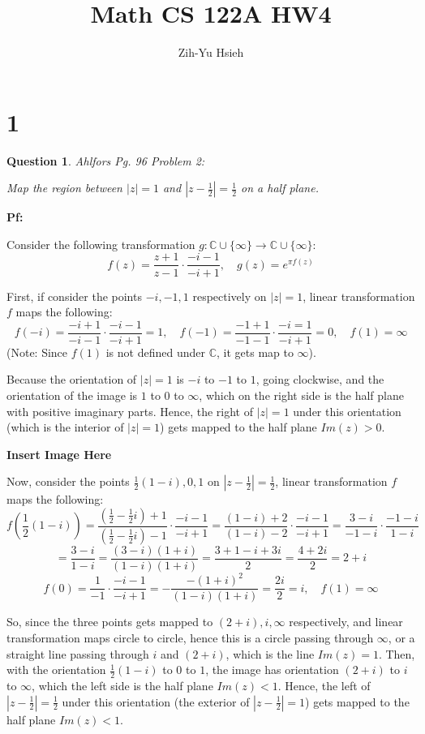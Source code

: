 \documentclass{article}
\title{Math CS 122A HW4}
\author{Zih-Yu Hsieh}
\newtheorem{question}{Question}
\begin{document}
\maketitle

\section*{1}
\begin{myBox}[]{}
    \begin{question}
        Ahlfors Pg. 96 Problem 2:

        Map the region between $|z|=1$ and $|z-\frac{1}{2}|=\frac{1}{2}$ on a half plane.
    \end{question}
\end{myBox}

\textbf{Pf:}

Consider the following transformation $g:\mathbb{C}\cup\{\infty\}\rightarrow\mathbb{C}\cup\{\infty\}$:
$$f(z)=\frac{z+1}{z-1}\cdot \frac{-i-1}{-i+1},\quad g(z)=e^{\pi f(z)}$$

First, if consider the points $-i,-1,1$ respectively on $|z|=1$, linear transformation $f$ maps the following:
$$f(-i)=\frac{-i+1}{-i-1}\cdot\frac{-i-1}{-i+1}=1,\quad f(-1)=\frac{-1+1}{-1-1}\cdot\frac{-i=1}{-i+1}=0,\quad f(1)=\infty$$
(Note: Since $f(1)$ is not defined under $\mathbb{C}$, it gets map to $\infty$).

Because the orientation of $|z|=1$ is $-i$ to $-1$ to $1$, going clockwise, and the orientation of the image is $1$ to $0$ to $\infty$, 
which on the right side is the half plane with positive imaginary parts. Hence, the right of $|z|=1$ under this orientation (which is the interior of $|z|=1$)
gets mapped to the half plane $Im(z)>0$.

\textbf{Insert Image Here}

\hfill

Now, consider the points $\frac{1}{2}(1-i), 0, 1$ on $|z-\frac{1}{2}|=\frac{1}{2}$, linear transformation $f$ maps the following:
$$f\left(\frac{1}{2}(1-i)\right)=\frac{(\frac{1}{2}-\frac{1}{2}i)+1}{(\frac{1}{2}-\frac{1}{2}i)-1}\cdot\frac{-i-1}{-i+1} = \frac{(1-i)+2}{(1-i)-2}\cdot\frac{-i-1}{-i+1}=\frac{3-i}{-1-i}\cdot\frac{-1-i}{1-i}$$
$$=\frac{3-i}{1-i}=\frac{(3-i)(1+i)}{(1-i)(1+i)}=\frac{3+1-i+3i}{2}=\frac{4+2i}{2}=2+i$$
$$f(0)=\frac{1}{-1}\cdot\frac{-i-1}{-i+1}=-\frac{-(1+i)^2}{(1-i)(1+i)}=\frac{2i}{2}=i,\quad f(1)=\infty$$

So, since the three points gets mapped to $(2+i), i, \infty$ respectively, and linear transformation maps circle to circle,
hence this is a circle passing through $\infty$, or a straight line passing through $i$ and $(2+i)$, which is the line $Im(z)=1$.
Then, with the orientation $\frac{1}{2}(1-i)$ to $0$ to $1$, the image has orientation $(2+i)$ to $i$ to $\infty$, which the left side is the half plane $Im(z)<1$.
Hence, the left of $|z-\frac{1}{2}|=\frac{1}{2}$ under this orientation (the exterior of $|z-\frac{1}{2}|=1$) gets mapped to the half plane $Im(z)<1$.
\end{document}
